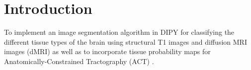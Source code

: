 \documentclass[twocolumn]{bmcart}%
\begin{document}
\begin{frontmatter}
\begin{fmbox}


	








%
\end{fmbox}%

\end{frontmatter}


\section{Introduction}\label{introduction}

To implement an image segmentation algorithm in DIPY
\cite{Garyfallidis2014} for classifying the different tissue types of
the brain using structural T1 images and diffusion MRI images (dMRI) as
well as to incorporate tissue probability maps for
Anatomically-Constrained Tractography (ACT) \cite{Smith20121924}.
\end{document}
